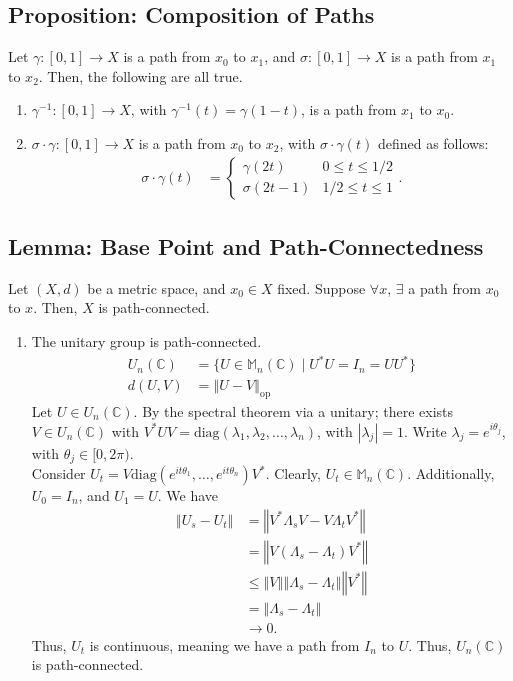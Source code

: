 \documentclass[9pt]{extarticle}
\newcommand{\norm}[1]{\left\Vert #1 \right\Vert}
\begin{document}
  \subsection{Proposition: Composition of Paths}%
  Let $\gamma: [0,1] \rightarrow X$ is a path from $x_0$ to $x_1$, and $\sigma: [0,1]\rightarrow X$ is a path from $x_1$ to $x_2$. Then, the following are all true.
  \begin{enumerate}[(1)]
    \item $\gamma^{-1}: [0,1]\rightarrow X$, with $\gamma^{-1}(t) = \gamma(1-t)$, is a path from $x_1$ to $x_0$.
    \item $\sigma \cdot \gamma: [0,1]\rightarrow X$ is a path from $x_0$ to $x_2$, with $\sigma \cdot \gamma(t)$ defined as follows:
      \begin{align*}
        \sigma \cdot \gamma(t) &= \begin{cases}
          \gamma(2t)&0\leq t \leq 1/2\\
          \sigma(2t-1) & 1/2 \leq t \leq 1
        \end{cases}.
      \end{align*}
  \end{enumerate}
  \subsection{Lemma: Base Point and Path-Connectedness}%
  Let $(X,d)$ be a metric space, and $x_0\in X$ fixed. Suppose $\forall x$, $\exists $ a path from $x_0$ to $x$. Then, $X$ is path-connected.
  \begin{enumerate}[(1)]
    \item The unitary group is path-connected.
      \begin{align*}
        U_n(\mathbb{C}) &= \{U\in \mathbb{M}_n(\mathbb{C})\mid U^{\ast}U = I_n = UU^{\ast}\}\\
        d(U,V) &= \norm{U-V}_{\text{op}}
      \end{align*}
      Let $U\in U_n(\mathbb{C})$. By the spectral theorem via a unitary; there exists $V\in U_n(\mathbb{C})$ with $V^{\ast} U V = \text{diag}(\lambda_1,\lambda_2,\dots,\lambda_n)$, with $|\lambda_j| = 1$. Write $\lambda_j = e^{i\theta_j}$, with $\theta_j\in [0,2\pi)$.\\

      Consider $U_t = V\text{diag}\left(e^{it\theta_1},\dots,e^{it\theta_n}\right)V^{\ast}$. Clearly, $U_t\in \mathbb{M}_n(\mathbb{C})$. Additionally, $U_0 = I_n$, and $U_1 = U$. We have
      \begin{align*}
        \norm{U_s - U_t} &= \norm{V^{\ast}\Lambda_s V - V\Lambda_tV^{\ast}}\\
                         &= \norm{V(\Lambda_s - \Lambda_t)V^{\ast}}\\
                         &\leq \norm{V}\norm{\Lambda_s - \Lambda_t}\norm{V^{\ast}}\\
                         &= \norm{\Lambda_s - \Lambda_t}\\
                         &\rightarrow 0.
      \end{align*}
      Thus, $U_t$ is continuous, meaning we have a path from $I_n$ to $U$. Thus, $U_n(\mathbb{C})$ is path-connected.
  \end{enumerate}
\end{document}
